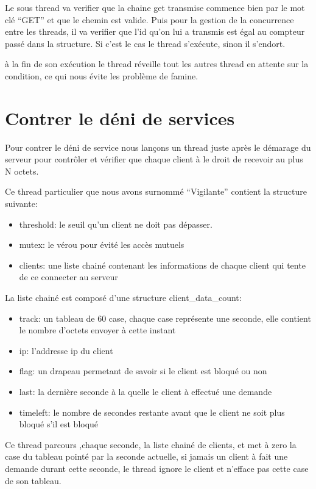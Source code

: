 \documentclass{article}
\begin{document}
Le sous thread va verifier que la chaine get transmise commence bien par le mot clé ``GET'' et que le chemin est valide. Puis pour la gestion de la concurrence entre les threads, il va verifier que l'id qu'on lui a transmis est égal au compteur passé dans la structure. Si c'est le cas le thread s'exécute, sinon il s'endort.

à la fin de son exécution le thread réveille tout les autres thread en attente sur la condition, ce qui nous évite les problème de famine.

\section{Contrer le déni de services}

Pour contrer le déni de service nous lançons un thread juste après le démarage du serveur pour contrôler et vérifier que chaque client à le droit de recevoir au plus N octets.

Ce thread particulier que nous avons surnommé ``Vigilante'' contient la structure suivante:
\begin{itemize}
\item threshold: le seuil qu'un client ne doit pas dépasser.
\item mutex: le vérou pour évité les accès mutuels
\item clients: une liste chainé contenant les informations de chaque client qui tente de ce connecter au serveur
\end{itemize}

La liste chainé est composé d'une structure client\_data\_count:

\begin{itemize}
\item track: un tableau de 60 case, chaque case représente une seconde, elle contient le nombre d'octets envoyer à cette instant
\item ip: l'addresse ip du client
\item flag: un drapeau permetant de savoir si le client est bloqué ou non
\item last: la dernière seconde à la quelle le client à effectué une demande
\item timeleft: le nombre de secondes restante avant que le client ne soit plus bloqué s'il est bloqué
\end{itemize}

Ce thread parcours ,chaque seconde, la liste chainé de clients, et met à zero la case du tableau pointé par la seconde actuelle, si jamais un client à fait une demande durant cette seconde, le thread ignore le client et n'efface pas cette case de son tableau.\hbox{}
\end{document}
